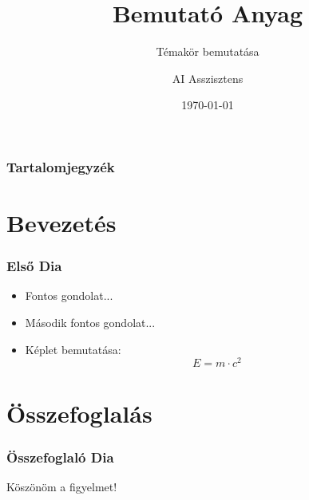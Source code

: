 \documentclass{beamer}
\title{Bemutató Anyag}
\subtitle{Témakör bemutatása}
\author{AI Asszisztens}
\date{\today}
\begin{document}
\frame{\titlepage}

\begin{frame}
\frametitle{Tartalomjegyzék}
\tableofcontents
\end{frame}

\section{Bevezetés}
\begin{frame}
\frametitle{Első Dia}
\begin{itemize}
    \item Fontos gondolat...
    \item Második fontos gondolat...
    \item Képlet bemutatása:
    \begin{equation}
        E = m \cdot c^2
    \end{equation}
\end{itemize}
\end{frame}

\section{Összefoglalás}
\begin{frame}
\frametitle{Összefoglaló Dia}
Köszönöm a figyelmet!
\end{frame}
\end{document}
